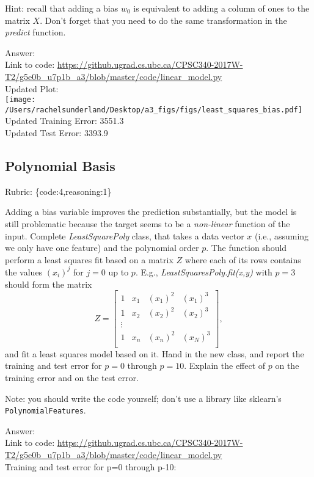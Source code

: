 \documentclass{article}
\def\rubric#1{\gre{Rubric: \{#1\}}}{}
\def\blu#1{{\color{blu}#1}}
\def\gre#1{{\color{gre}#1}}
\begin{document}
Hint: recall that adding a bias $w_0$ is equivalent to adding a column of ones to the matrix $X$. Don't forget that you need to do the same transformation in the \emph{predict} function.

\gre{Answer: }
\\ \gre{Link to code:}
\url{https://github.ugrad.cs.ubc.ca/CPSC340-2017W-T2/g5e0b_u7p1b_a3/blob/master/code/linear_model.py}
\\ \gre{Updated Plot: }
\\ \texttt{[image: /Users/rachelsunderland/Desktop/a3\_figs/figs/least\_squares\_bias.pdf]}
\\ \gre{Updated Training Error: 3551.3}
\\ \gre{Updated Test Error: 3393.9}

\iffalse

\fi


\subsection{Polynomial Basis}
\rubric{code:4,reasoning:1}

Adding a bias variable improves the prediction substantially, but the model is still problematic because the target seems to be a \emph{non-linear} function of the input.
Complete \emph{LeastSquarePoly} class, that takes a data vector $x$ (i.e., assuming we only have one feature) and the polynomial order $p$. The function should perform a least squares fit based on a matrix $Z$ where each of its rows contains the values $(x_{i})^j$ for $j=0$ up to $p$. E.g., \emph{LeastSquaresPoly.fit(x,y)}  with $p = 3$ should form the matrix
\[
Z =
\left[\begin{array}{cccc}
1 & x_1 & (x_1)^2 & (x_1)^3\\
1 & x_2 & (x_2)^2 & (x_2)^3\\
\vdots\\
1 & x_n & (x_n)^2 & (x_N)^3\\
\end{array}
\right],
\]
and fit a least squares model based on it.
\blu{Hand in the new class, and report the training and test error for $p = 0$ through $p= 10$. Explain the effect of $p$ on the training error and on the test error.}

Note: you should write the code yourself; don't use a library like sklearn's \texttt{PolynomialFeatures}.

\gre{Answer: }
\\ \gre{Link to code:} \url{https://github.ugrad.cs.ubc.ca/CPSC340-2017W-T2/g5e0b_u7p1b_a3/blob/master/code/linear_model.py}
\\ \gre{Training and test error for p=0 through p-10:}
\end{document}

